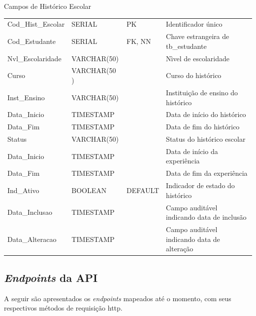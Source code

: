 \begin{quadro}[H]
	\caption{Campos de Histórico Escolar}
	\centering
	\begin{tabular}{| l | l | l | p{} |}
		\hline
		\thead{Campo} & \thead{Tipo} & \thead{Restrição}	& \thead{Descrição}\\
		\hline
		Cod\_Hist\_Escolar & SERIAL      & PK      & Identificador único                \\ 
		\hline
		Cod\_Estudante        & SERIAL      & FK, NN    & Chave estrangeira de tb\_estudante    \\ 
		\hline
		Nvl\_Escolaridade        & VARCHAR(50)      & & Nìvel de escolaridade    \\ 
		\hline
		Curso  & VARCHAR(50 )& & Curso do histórico \\ 
		\hline
		Inst\_Ensino & VARCHAR(50) &         & Instituição de ensino do histórico \\ 
		\hline
		Data\_Inicio  & TIMESTAMP &         & Data de início do histórico \\
		\hline
		Data\_Fim  & TIMESTAMP &         & Data de fim do histórico \\
		\hline
		Status  & VARCHAR(50) &         & Status do histórico escolar \\
		\hline
		Data\_Inicio  & TIMESTAMP &         & Data de início da experiência \\
		\hline
		Data\_Fim  & TIMESTAMP &         & Data de fim da experiência \\
		\hline
		Ind\_Ativo         & BOOLEAN     & DEFAULT & Indicador de estado do histórico   \\ 
		\hline
		Data\_Inclusao  & TIMESTAMP &         & Campo auditável indicando data de inclusão        \\ 
		\hline
		Data\_Alteracao & TIMESTAMP &         & Campo auditável indicando data de alteração        \\ 
		\hline
	\end{tabular}
	\label{campos-rh}
\end{quadro}


\subsection{\textit{Endpoints} da API}
A seguir são apresentados os \textit{\glspl{endpoint}} mapeados até o momento, com seus respectivos métodos de requisição \gls{http}.


